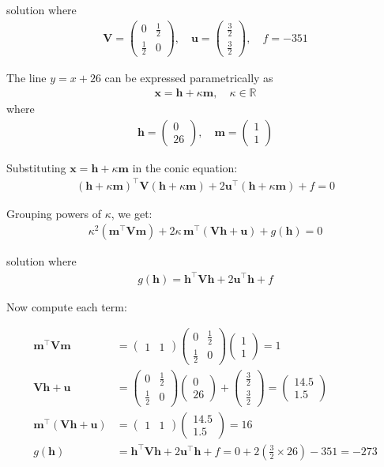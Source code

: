\documentclass{beamer}
\numberwithin{equation}{section}
\theoremstyle{remark}
\newcommand{\myvec}[1]{\ensuremath{\begin{pmatrix}#1\end{pmatrix}}}
\let\vec\mathbf
\begin{document}
\begin{frame}{solution}
where
\begin{align}
\vec{V} = \myvec{0 & \tfrac{1}{2} \\[4pt] \tfrac{1}{2} & 0}, \quad
\vec{u} = \myvec{\tfrac{3}{2} \\[4pt] \tfrac{3}{2}}, \quad
f = -351
\end{align}

The line $y = x + 26$ can be expressed parametrically as
\begin{align}
\vec{x} = \vec{h} + \kappa \vec{m}, \quad \kappa \in \mathbb{R}
\end{align}
where
\begin{align}
\vec{h} = \myvec{0 \\ 26}, \quad \vec{m} = \myvec{1 \\ 1}
\end{align}

Substituting $\vec{x} = \vec{h} + \kappa \vec{m}$ in the conic equation:
\begin{align}
(\vec{h} + \kappa\vec{m})^\top \vec{V}(\vec{h} + \kappa\vec{m})
+ 2\vec{u}^\top (\vec{h} + \kappa\vec{m}) + f = 0
\end{align}

Grouping powers of $\kappa$, we get:
\begin{align}
\kappa^2 (\vec{m}^\top \vec{V}\vec{m})
+ 2\kappa\, \vec{m}^\top (\vec{V}\vec{h} + \vec{u})
+ g(\vec{h}) = 0
\end{align}
\end{frame}
\begin{frame}{solution}
where
\begin{align}
g(\vec{h}) = \vec{h}^\top \vec{V}\vec{h} + 2\vec{u}^\top \vec{h} + f
\end{align}

Now compute each term:

\begin{align}
\vec{m}^\top \vec{V}\vec{m} &= 
\myvec{1 & 1}
\myvec{0 & \tfrac{1}{2} \\[4pt] \tfrac{1}{2} & 0}
\myvec{1 \\[4pt] 1}
= 1
\\[6pt]
\vec{V}\vec{h} + \vec{u} &=
\myvec{0 & \tfrac{1}{2} \\[4pt] \tfrac{1}{2} & 0}\myvec{0 \\[4pt] 26}
+ \myvec{\tfrac{3}{2} \\[4pt] \tfrac{3}{2}}
= \myvec{14.5 \\[4pt] 1.5}
\\[6pt]
\vec{m}^\top (\vec{V}\vec{h} + \vec{u}) &= \myvec{1 & 1}\myvec{14.5 \\[4pt] 1.5} = 16
\\[6pt]
g(\vec{h}) &= \vec{h}^\top \vec{V}\vec{h} + 2\vec{u}^\top \vec{h} + f
= 0 + 2(\tfrac{3}{2}\times 26) - 351 = -273
\end{align}
\end{frame}
\end{document}
